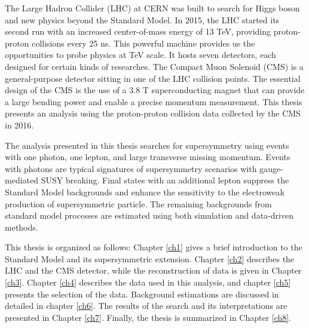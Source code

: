 \documentclass[12pt,twoside]{memoir}
\begin{document}
The Large Hadron Collider (LHC) at CERN was built to search for Higgs boson and new physics beyond the Standard Model.
In 2015, the LHC started its second run with an increased center-of-mass energy of 13 TeV, providing proton-proton collisions every 25 ns. 
This powerful machine provides us the opportunities to probe physics at TeV scale. 
It hosts seven detectors, each designed for certain kinds of researches. 
The Compact Muon Solenoid (CMS) is a general-purpose detector sitting in one of the LHC collision points. 
The essential design of the CMS is the use of a 3.8 T superconducting magnet that can provide a large bending power and enable a precise momentum measurement. 
This thesis presents an analysis using the proton-proton collision data collected by the CMS in 2016. 

The analysis presented in this thesis searches for supersymmetry using events with one photon, one lepton, and large transverse missing momentum.  
Events with photons are typical signatures of supersymmetry scenarios with gauge-mediated SUSY breaking.
Final states with an additional lepton suppress the Standard Model backgrounds and enhance the sensitivity to the electroweak production of supersymmetric particle.
The remaining backgrounds from standard model processes are estimated using both simulation and data-driven methods. 

This thesis is organized as follows: Chapter \ref{ch1} gives a brief introduction to the Standard Model and its supersymmetric extension. Chapter \ref{ch2} describes the LHC and the CMS detector, while the reconstruction of data is given in Chapter \ref{ch3}. Chapter \ref{ch4} describes the data used in this analysis, and chapter  \ref{ch5} presents the selection of the data. Background estimations are discussed in detailed in chapter \ref{ch6}. The results of the search and its interpretations are presented in Chapter \ref{ch7}. Finally, the thesis is summarized in Chapter \ref{ch8}.

 









\newpage


\end{document}

